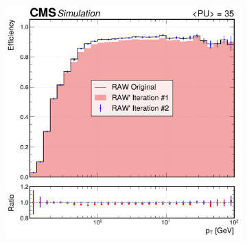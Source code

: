 \begin{figure}[!htbp]
\begin{subfigure}[b]{0.49\textwidth}
            \includegraphics[width=\textwidth]{Figures/Chapter5/efficiency_comparison_2_pt.pdf}
            \caption{}
        \end{subfigure}

        \vspace{0.5cm}


\end{figure}
